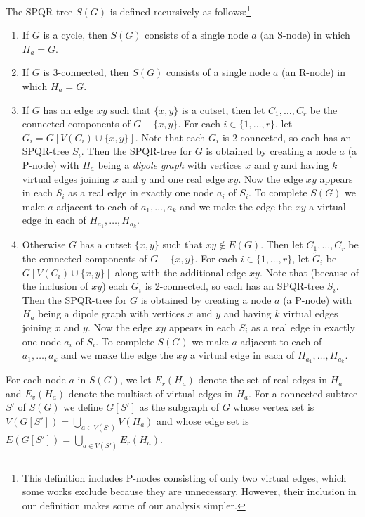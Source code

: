 \documentclass[a4paper,11pt]{article}
\theoremstyle{plain}
\theoremstyle{definition}
\begin{document}
The SPQR-tree $S(G)$ is defined recursively as follows:\footnote{This
definition includes P-nodes consisting of only two virtual edges, which
some works exclude because they are unnecessary. However, their inclusion
in our definition makes some of our analysis simpler.}
\begin{enumerate}
   \item If $G$ is a cycle, then $S(G)$ consists of a single node $a$
     (an S-node) in which $H_a=G$.
   \item If $G$ is 3-connected, then $S(G)$ consists of a single node $a$
     (an R-node) in which $H_a=G$.  
   \item If $G$ has an edge $xy$ such that $\{x,y\}$ is a cutset,
     then let $C_1,\ldots,C_r$ be the connected components of $G-\{x,y\}$.
     For each $i\in \{1,\ldots,r\}$, let $G_i=G[V(C_i)\cup\{x,y\}]$.
     Note that each $G_i$ is 2-connected, so each has an SPQR-tree $S_i$.
     Then the SPQR-tree for $G$ is obtained by creating a node $a$ (a
     P-node) with $H_a$ being a \emph{dipole graph} with vertices $x$
     and $y$ and having $k$ virtual edges joining $x$ and $y$ and one
     real edge $xy$.  Now the edge $xy$ appears in each $S_i$ as a real
     edge in exactly one node $a_i$ of $S_i$.
     To complete $S(G)$ we make $a$ adjacent to each of $a_1,\ldots,a_k$ and we
     make the edge the $xy$ a virtual edge in each of $H_{a_1},\ldots,H_{a_k}$.

   \item Otherwise $G$ has a cutset $\{x,y\}$ such that $xy\not\in E(G)$.
     Then let $C_1,\ldots,C_r$ be the connected components of
     $G-\{x,y\}$.  For each $i\in \{1,\ldots,r\}$, let $\tilde{G}_i$
     be $G[V(C_i)\cup\{x,y\}]$ along with the additional edge $xy$.
     Note that (because of the inclusion of $xy$) each $G_i$  is
     2-connected, so each has an SPQR-tree $S_i$.  Then the SPQR-tree
     for $G$ is obtained by creating a node $a$ (a P-node) with $H_a$
     being a dipole graph with vertices $x$ and $y$ and having $k$
     virtual edges joining $x$ and $y$.  Now the edge $xy$ appears in each
     $S_i$ as a real edge in exactly one node $a_i$ of $S_i$.  To complete
     $S(G)$ we make $a$ adjacent to each of $a_1,\ldots,a_k$ and we make
     the edge the $xy$ a virtual edge in each of $H_{a_1},\ldots,H_{a_k}$.
\end{enumerate}

For each node $a$ in $S(G)$, we let $E_r(H_a)$ denote the set of real
edges in $H_a$ and $E_v(H_a)$ denote the multiset of virtual edges
in $H_a$.  For a connected subtree $S'$ of $S(G)$ we define $G[S']$ as
the subgraph of $G$ whose vertex set is $V(G[S'])=\bigcup_{a\in V(S')}
V(H_a)$ and whose edge set is $E(G[S'])=\bigcup_{a\in V(S')} E_r(H_a)$.
\end{document}
